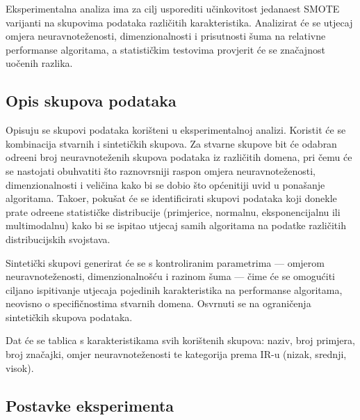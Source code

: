 
Eksperimentalna analiza ima za cilj usporediti u\v{c}inkovitost
jedanaest SMOTE varijanti na skupovima podataka razli\v{c}itih
karakteristika. Analizirat \'{c}e se utjecaj omjera neuravnote\v{z}enosti,
dimenzionalnosti i prisutnosti \v{s}uma na relativne performanse
algoritama, a statisti\v{c}kim testovima provjerit \'{c}e se
zna\v{c}ajnost uo\v{c}enih razlika.

\subsection{Opis skupova podataka}

Opisuju se skupovi podataka kori\v{s}teni u eksperimentalnoj
analizi. Koristit \'{c}e se kombinacija stvarnih i sinteti\v{c}kih
skupova. Za stvarne skupove bit \'{c}e odabran odre\dj{}eni broj
neuravnote\v{z}enih skupova podataka iz razli\v{c}itih domena, pri
\v{c}emu \'{c}e se nastojati obuhvatiti \v{s}to raznovrsniji raspon
omjera neuravnote\v{z}enosti, dimenzionalnosti i veli\v{c}ina kako bi
se dobio \v{s}to op\'{c}enitiji uvid u pona\v{s}anje algoritama.
Tako\dj{}er, poku\v{s}at \'{c}e se identificirati skupovi podataka koji
donekle prate odre\dj{}ene statisti\v{c}ke distribucije (primjerice,
normalnu, eksponencijalnu ili multimodalnu) kako bi se ispitao utjecaj
samih algoritama na podatke razli\v{c}itih distribucijskih svojstava.

Sinteti\v{c}ki skupovi generirat \'{c}e se s kontroliranim parametrima --- omjerom neuravnote\v{z}enosti, dimenzionalno\v{s}\'{c}u i razinom
\v{s}uma --- \v{c}ime \'{c}e se omogu\'{c}iti ciljano ispitivanje
utjecaja pojedinih karakteristika na performanse algoritama, neovisno
o specifi\v{c}nostima stvarnih domena. Osvrnuti se na ograni\v{c}enja
sinteti\v{c}kih skupova podataka.

Dat \'{c}e se tablica s karakteristikama svih kori\v{s}tenih skupova:
naziv, broj primjera, broj zna\v{c}ajki, omjer neuravnote\v{z}enosti
te kategorija prema IR-u (nizak, srednji, visok).

\subsection{Postavke eksperimenta}

